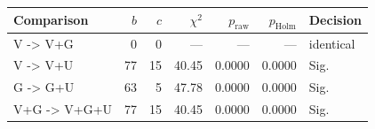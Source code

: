 \begin{tabular}{@{}lrrrrrl@{}}
\toprule
Comparison & $b$ & $c$ & $\chi^2$ & $p_\mathrm{raw}$ & $p_\mathrm{Holm}$ & Decision \\
\midrule
V -> V+G & 0 & 0 & --- & --- & --- & identical \\
V -> V+U & 77 & 15 & 40.45 & 0.0000 & 0.0000 & Sig. \\
G -> G+U & 63 & 5 & 47.78 & 0.0000 & 0.0000 & Sig. \\
V+G -> V+G+U & 77 & 15 & 40.45 & 0.0000 & 0.0000 & Sig. \\
\bottomrule
\end{tabular}

